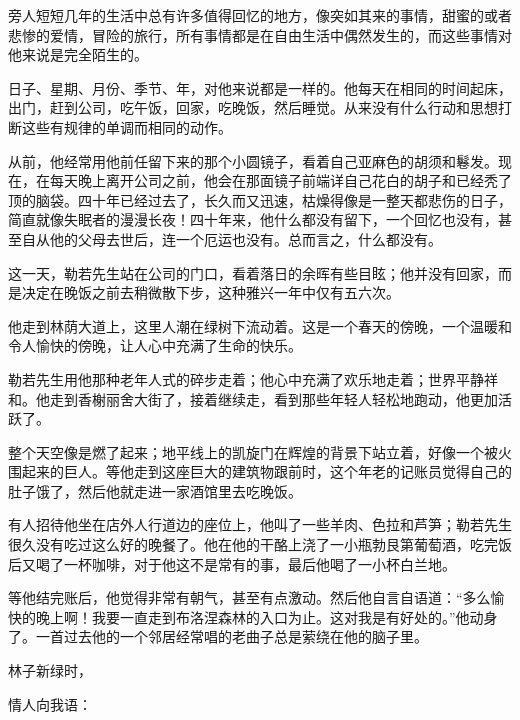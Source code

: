 \documentclass{article}
\begin{document}
旁人短短几年的生活中总有许多值得回忆的地方，像突如其来的事情，甜蜜的或者悲惨的爱情，冒险的旅行，所有事情都是在自由生活中偶然发生的，而这些事情对他来说是完全陌生的。



日子、星期、月份、季节、年，对他来说都是一样的。他每天在相同的时间起床，出门，赶到公司，吃午饭，回家，吃晚饭，然后睡觉。从来没有什么行动和思想打断这些有规律的单调而相同的动作。



从前，他经常用他前任留下来的那个小圆镜子，看着自己亚麻色的胡须和鬈发。现在，在每天晚上离开公司之前，他会在那面镜子前端详自己花白的胡子和已经秃了顶的脑袋。四十年已经过去了，长久而又迅速，枯燥得像是一整天都悲伤的日子，简直就像失眠者的漫漫长夜！四十年来，他什么都没有留下，一个回忆也没有，甚至自从他的父母去世后，连一个厄运也没有。总而言之，什么都没有。



这一天，勒若先生站在公司的门口，看着落日的余晖有些目眩；他并没有回家，而是决定在晚饭之前去稍微散下步，这种雅兴一年中仅有五六次。



他走到林荫大道上，这里人潮在绿树下流动着。这是一个春天的傍晚，一个温暖和令人愉快的傍晚，让人心中充满了生命的快乐。



勒若先生用他那种老年人式的碎步走着；他心中充满了欢乐地走着；世界平静祥和。他走到香榭丽舍大街了，接着继续走，看到那些年轻人轻松地跑动，他更加活跃了。



整个天空像是燃了起来；地平线上的凯旋门在辉煌的背景下站立着，好像一个被火围起来的巨人。等他走到这座巨大的建筑物跟前时，这个年老的记账员觉得自己的肚子饿了，然后他就走进一家酒馆里去吃晚饭。



有人招待他坐在店外人行道边的座位上，他叫了一些羊肉、色拉和芦笋；勒若先生很久没有吃过这么好的晚餐了。他在他的干酪上浇了一小瓶勃艮第葡萄酒，吃完饭后又喝了一杯咖啡，对于他这不是常有的事，最后他喝了一小杯白兰地。



等他结完账后，他觉得非常有朝气，甚至有点激动。然后他自言自语道：“多么愉快的晚上啊！我要一直走到布洛涅森林的入口为止。这对我是有好处的。”他动身了。一首过去他的一个邻居经常唱的老曲子总是萦绕在他的脑子里。



林子新绿时，



情人向我语：
\end{document}
